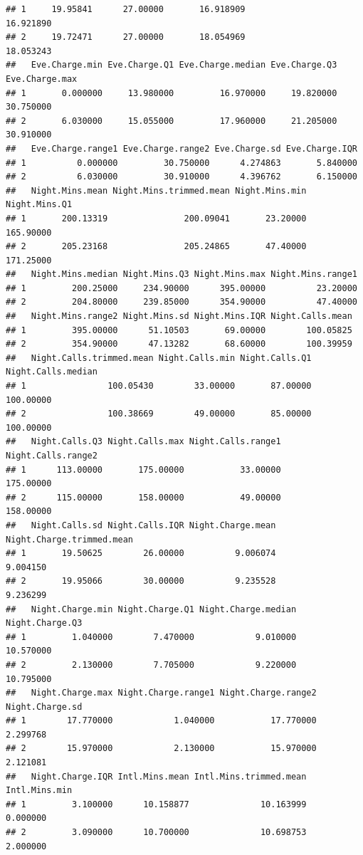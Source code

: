 \documentclass{article}\usepackage[]{graphicx}\usepackage[]{color}
\makeatletter
\newenvironment{kframe}{%
 \def\at@end@of@kframe{}%
 \ifinner\ifhmode%
  \def\at@end@of@kframe{\end{minipage}}%
  \begin{minipage}{\columnwidth}%
 \fi\fi%
 \def\FrameCommand##1{\hskip\@totalleftmargin \hskip-\fboxsep
 \colorbox{shadecolor}{##1}\hskip-\fboxsep
     \hskip-\linewidth \hskip-\@totalleftmargin \hskip\columnwidth}%
 \MakeFramed {\advance\hsize-\width
   \@totalleftmargin\z@ \linewidth\hsize
   \@setminipage}}%
 {\par\unskip\endMakeFramed%
 \at@end@of@kframe}
\newenvironment{knitrout}{}{} %
\makeatother
\begin{document}
\begin{description}
\begin{knitrout}
\begin{kframe}
\begin{verbatim}
## 1     19.95841      27.00000       16.918909               16.921890
## 2     19.72471      27.00000       18.054969               18.053243
##   Eve.Charge.min Eve.Charge.Q1 Eve.Charge.median Eve.Charge.Q3 Eve.Charge.max
## 1       0.000000     13.980000         16.970000     19.820000      30.750000
## 2       6.030000     15.055000         17.960000     21.205000      30.910000
##   Eve.Charge.range1 Eve.Charge.range2 Eve.Charge.sd Eve.Charge.IQR
## 1          0.000000         30.750000      4.274863       5.840000
## 2          6.030000         30.910000      4.396762       6.150000
##   Night.Mins.mean Night.Mins.trimmed.mean Night.Mins.min Night.Mins.Q1
## 1       200.13319               200.09041       23.20000     165.90000
## 2       205.23168               205.24865       47.40000     171.25000
##   Night.Mins.median Night.Mins.Q3 Night.Mins.max Night.Mins.range1
## 1         200.25000     234.90000      395.00000          23.20000
## 2         204.80000     239.85000      354.90000          47.40000
##   Night.Mins.range2 Night.Mins.sd Night.Mins.IQR Night.Calls.mean
## 1         395.00000      51.10503       69.00000        100.05825
## 2         354.90000      47.13282       68.60000        100.39959
##   Night.Calls.trimmed.mean Night.Calls.min Night.Calls.Q1 Night.Calls.median
## 1                100.05430        33.00000       87.00000          100.00000
## 2                100.38669        49.00000       85.00000          100.00000
##   Night.Calls.Q3 Night.Calls.max Night.Calls.range1 Night.Calls.range2
## 1      113.00000       175.00000           33.00000          175.00000
## 2      115.00000       158.00000           49.00000          158.00000
##   Night.Calls.sd Night.Calls.IQR Night.Charge.mean Night.Charge.trimmed.mean
## 1       19.50625        26.00000          9.006074                  9.004150
## 2       19.95066        30.00000          9.235528                  9.236299
##   Night.Charge.min Night.Charge.Q1 Night.Charge.median Night.Charge.Q3
## 1         1.040000        7.470000            9.010000       10.570000
## 2         2.130000        7.705000            9.220000       10.795000
##   Night.Charge.max Night.Charge.range1 Night.Charge.range2 Night.Charge.sd
## 1        17.770000            1.040000           17.770000        2.299768
## 2        15.970000            2.130000           15.970000        2.121081
##   Night.Charge.IQR Intl.Mins.mean Intl.Mins.trimmed.mean Intl.Mins.min
## 1         3.100000      10.158877              10.163999      0.000000
## 2         3.090000      10.700000              10.698753      2.000000

\end{verbatim}
\end{kframe}
\end{knitrout}
\end{description}
\end{document}
